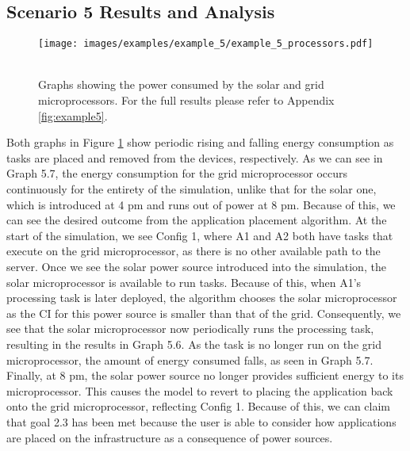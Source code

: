 \documentclass{l4proj}
\begin{document}
\subsection{Scenario 5 Results and Analysis}
\begin{figure}[h]
    \centering
    \texttt{[image: images/examples/example\_5/example\_5\_processors.pdf]}
    ~
    \caption{Graphs showing the power consumed by the solar and grid microprocessors. For the full results please refer to Appendix \ref{fig:example5}.}
    \label{fig:example5_microprocessors}
\end{figure}

Both graphs in Figure \ref{fig:example5_microprocessors} show periodic rising and falling energy consumption as tasks are placed and removed from the devices, respectively.
As we can see in Graph 5.7, the energy consumption for the grid microprocessor occurs continuously for the entirety of the simulation, unlike that for the solar one, which is introduced at 4 pm and runs out of power at 8 pm.
Because of this, we can see the desired outcome from the application placement algorithm.
At the start of the simulation, we see Config 1, where A1 and A2 both have tasks that execute on the grid microprocessor, as there is no other available path to the server.
Once we see the solar power source introduced into the simulation, the solar microprocessor is available to run tasks.
Because of this, when A1's processing task is later deployed, the algorithm chooses the solar microprocessor as the CI for this power source is smaller than that of the grid.
Consequently, we see that the solar microprocessor now periodically runs the processing task, resulting in the results in Graph 5.6.
As the task is no longer run on the grid microprocessor, the amount of energy consumed falls, as seen in Graph 5.7.
Finally, at 8 pm, the solar power source no longer provides sufficient energy to its microprocessor.
This causes the model to revert to placing the application back onto the grid microprocessor, reflecting Config 1.
Because of this, we can claim that goal 2.3 has been met because the user is able to consider how applications are placed on the infrastructure as a consequence of power sources.
\end{document}
